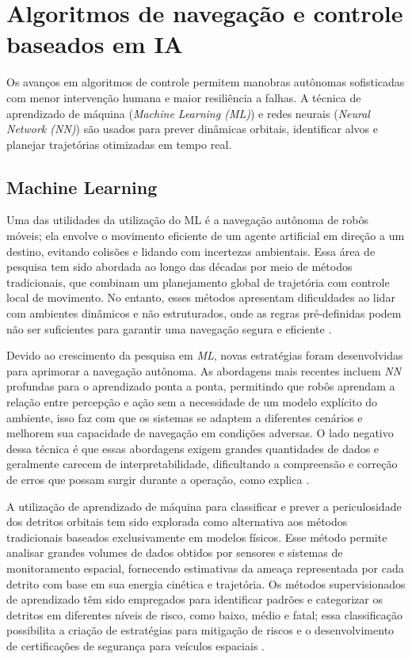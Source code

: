 \section{Algoritmos de navegação e controle baseados em IA}

Os avanços em algoritmos de controle permitem manobras autônomas sofisticadas com menor intervenção humana e maior resiliência a falhas.
A técnica de aprendizado de máquina (\emph{Machine Learning (ML)}) e redes neurais (\emph{Neural Network (NN)}) são usados para prever dinâmicas orbitais, identificar alvos e planejar trajetórias otimizadas em tempo real.

\subsection{Machine Learning}

Uma das utilidades da utilização do ML é a navegação autônoma de robôs móveis; ela envolve o movimento eficiente de um agente artificial em direção a um destino, evitando colisões e lidando com incertezas ambientais.
Essa área de pesquisa tem sido abordada ao longo das décadas por meio de métodos tradicionais, que combinam um planejamento global de trajetória com controle local de movimento. No entanto, esses métodos apresentam dificuldades ao lidar com ambientes dinâmicos e não estruturados, onde as regras pré-definidas podem não ser suficientes para garantir uma navegação segura e eficiente \cite{xiao2022}.

Devido ao crescimento da pesquisa em \emph{ML}, novas estratégias foram desenvolvidas para aprimorar a navegação autônoma.
As abordagens mais recentes incluem \emph{NN} profundas para o aprendizado ponta a ponta, permitindo que robôs aprendam a relação entre percepção e ação sem a necessidade de um modelo explícito do ambiente, isso faz com que os sistemas se adaptem a diferentes cenários e melhorem sua capacidade de navegação em condições adversas.
O lado negativo dessa técnica é que essas abordagens exigem grandes quantidades de dados e geralmente carecem de interpretabilidade, dificultando a compreensão e correção de erros que possam surgir durante a operação, como explica \cite{xiao2022}.

A utilização de aprendizado de máquina para classificar e prever a periculosidade dos detritos orbitais tem sido explorada como alternativa aos métodos tradicionais baseados exclusivamente em modelos físicos.
Esse método permite analisar grandes volumes de dados obtidos por sensores e sistemas de monitoramento espacial, fornecendo estimativas da ameaça representada por cada detrito com base em sua energia cinética e trajetória.
Os métodos supervisionados de aprendizado têm sido empregados para identificar padrões e categorizar os detritos em diferentes níveis de risco, como baixo, médio e fatal; essa classificação possibilita a criação de estratégias para mitigação de riscos e o desenvolvimento de certificações de segurança para veículos espaciais \cite{sri2024}.

